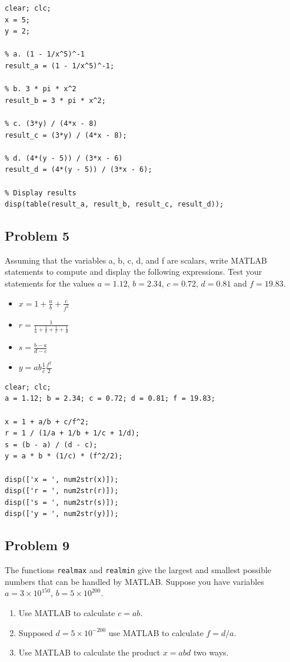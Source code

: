\documentclass[DIN, pagenumber=false, fontsize=11pt, parskip=half]{scrartcl}
\newcommand{\myproblem}[1]{\subsection*{#1}}
\begin{document}
\begin{lstlisting}
clear; clc;
x = 5;
y = 2;

% a. (1 - 1/x^5)^-1
result_a = (1 - 1/x^5)^-1;

% b. 3 * pi * x^2
result_b = 3 * pi * x^2;

% c. (3*y) / (4*x - 8)
result_c = (3*y) / (4*x - 8);

% d. (4*(y - 5)) / (3*x - 6)
result_d = (4*(y - 5)) / (3*x - 6);

% Display results
disp(table(result_a, result_b, result_c, result_d));
\end{lstlisting}

\myproblem{Problem 5}
Assuming that the variables a, b, c, d, and f are scalars, write MATLAB statements to compute and display the following expressions. Test your statements for the values $a=1.12$, $b=2.34$, $c=0.72$, $d=0.81$ and $f=19.83$.
\begin{itemize}
    \item $x=1+\frac{a}{b}+\frac{c}{f^{2}}$
    \item $r=\frac{1}{\frac{1}{a}+\frac{1}{b}+\frac{1}{c}+\frac{1}{d}}$
    \item $s=\frac{b-a}{d-c}$
    \item $y=ab\frac{1}{c}\frac{f^{2}}{2}$
\end{itemize}

\begin{lstlisting}
clear; clc;
a = 1.12; b = 2.34; c = 0.72; d = 0.81; f = 19.83;

x = 1 + a/b + c/f^2;
r = 1 / (1/a + 1/b + 1/c + 1/d);
s = (b - a) / (d - c);
y = a * b * (1/c) * (f^2/2);

disp(['x = ', num2str(x)]);
disp(['r = ', num2str(r)]);
disp(['s = ', num2str(s)]);
disp(['y = ', num2str(y)]);
\end{lstlisting}

\myproblem{Problem 9}
The functions \texttt{realmax} and \texttt{realmin} give the largest and smallest possible numbers that can be handled by MATLAB.
Suppose you have variables $a=3\times10^{150}$, $b=5\times10^{200}$.
\begin{enumerate}
    \item[a.] Use MATLAB to calculate $c=ab$.
    \item[b.] Supposed $d=5\times10^{-200}$ use MATLAB to calculate $f=d/a$.
    \item[c.] Use MATLAB to calculate the product $x=abd$ two ways.
\end{enumerate}
\end{document}
